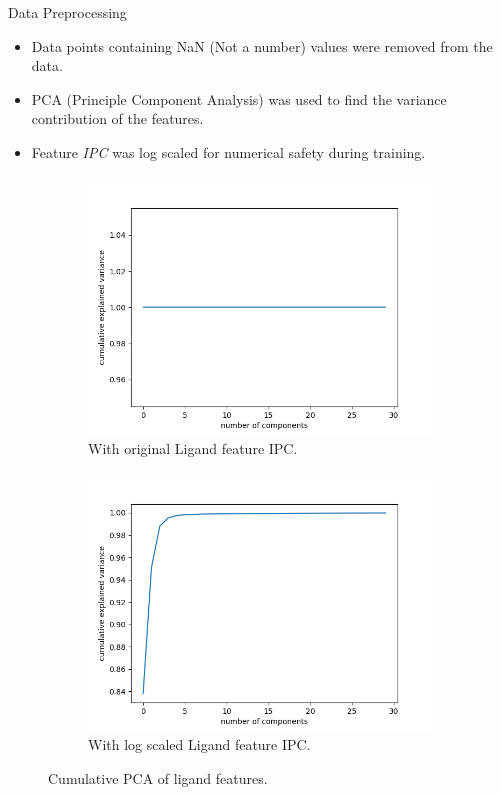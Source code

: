 \documentclass{beamer}
\begin{document}
\begin{frame}[t]{Data Preprocessing}
\begin{itemize}
\item Data points containing NaN (Not a number) values were removed from the data.
\item PCA (Principle Component Analysis) was used to find the variance contribution of the features.
\item Feature \textit{IPC} was log scaled for numerical safety during training.
\end{itemize}

\begin{figure}
     \centering
     \begin{subfigure}[b]{0.4\textwidth}
         \centering
    \includegraphics[scale=0.25]{images/pcaligandanalysisIPC}
    \caption{With original Ligand feature IPC.}
    \label{fig:pcaproteinanalysisIPC}
     \end{subfigure}
     \hfill
     \begin{subfigure}[b]{0.4\textwidth}
         \centering
        \includegraphics[scale=0.25]{images/pcawithscaledIPC}
        \caption{With log scaled Ligand feature IPC.}
        \label{fig:pcawithscaledIPC}
     \end{subfigure}
     \caption{Cumulative PCA of ligand features.}
     \label{fig:PCAAnalysis}
\end{figure}


\end{frame}
\end{document}
